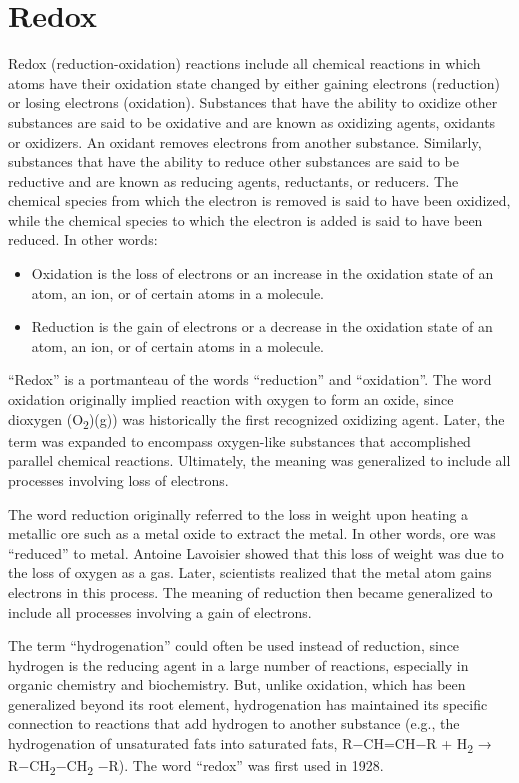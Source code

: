 \hypertarget{redox}{%
\section{Redox}\label{redox}}

Redox (reduction-oxidation) reactions include all chemical reactions in which atoms have their oxidation state changed by either gaining electrons (reduction) or losing electrons (oxidation). Substances that have the ability to oxidize other substances are said to be oxidative and are known as oxidizing agents, oxidants or oxidizers. An oxidant removes electrons from another substance. Similarly, substances that have the ability to reduce other substances are said to be reductive and are known as reducing agents, reductants, or reducers. The chemical species from which the electron is removed is said to have been oxidized, while the chemical species to which the electron is added is said to have been reduced. In other words:

\begin{itemize}
\tightlist
\item
  Oxidation is the loss of electrons or an increase in the oxidation state of an atom, an ion, or of certain atoms in a molecule.
\item
  Reduction is the gain of electrons or a decrease in the oxidation state of an atom, an ion, or of certain atoms in a molecule.
\end{itemize}

``Redox'' is a portmanteau of the words ``reduction'' and ``oxidation''. The word oxidation originally implied reaction with oxygen to form an oxide, since dioxygen (O\textsubscript{2})(g)) was historically the first recognized oxidizing agent. Later, the term was expanded to encompass oxygen-like substances that accomplished parallel chemical reactions. Ultimately, the meaning was generalized to include all processes involving loss of electrons.

The word reduction originally referred to the loss in weight upon heating a metallic ore such as a metal oxide to extract the metal. In other words, ore was ``reduced'' to metal. Antoine Lavoisier showed that this loss of weight was due to the loss of oxygen as a gas. Later, scientists realized that the metal atom gains electrons in this process. The meaning of reduction then became generalized to include all processes involving a gain of electrons.

The term ``hydrogenation'' could often be used instead of reduction, since hydrogen is the reducing agent in a large number of reactions, especially in organic chemistry and biochemistry. But, unlike oxidation, which has been generalized beyond its root element, hydrogenation has maintained its specific connection to reactions that add hydrogen to another substance (e.g., the hydrogenation of unsaturated fats into saturated fats, R−CH=CH−R + H\textsubscript{2} → R−CH\textsubscript{2}−CH\textsubscript{2} −R). The word ``redox'' was first used in 1928.

